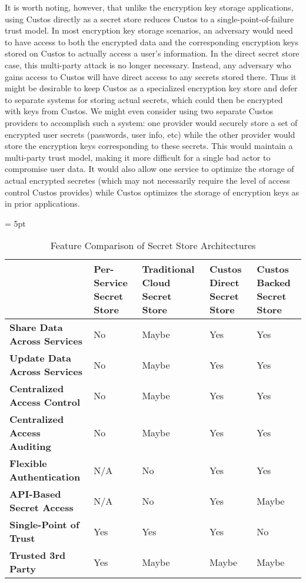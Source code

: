 It is worth noting, however, that unlike the encryption key storage
applications, using Custos directly as a secret store reduces Custos
to a single-point-of-failure trust model. In most encryption key
storage scenarios, an adversary would need to have access to both the
encrypted data and the corresponding encryption keys stored on Custos
to actually access a user's information. In the direct secret store
case, this multi-party attack is no longer necessary. Instead, any
adversary who gains access to Custos will have direct access to any
secrets stored there. Thus it might be desirable to keep Custos as a
specialized encryption key store and defer to separate systems for
storing actual secrets, which could then be encrypted with keys from
Custos. We might even consider using two separate Custos providers to
accomplish such a system: one provider would securely store a set of
encrypted user secrets (passwords, user info, etc) while the other
provider would store the encryption keys corresponding to these
secrets. This would maintain a multi-party trust model, making it more
difficult for a single bad actor to compromise user data. It would
also allow one service to optimize the storage of actual encrypted
secretes (which may not necessarily require the level of access
control Custos provides) while Custos optimizes the storage of
encryption keys as in prior applications.

\begin{table}[!tb]
  \vspace{5ex}
  \begin{center}
    \tabulinesep = 5pt
    \begin{tabu} to \textwidth
      { | X[1.5,c,m]
        | X[1,c,m]
        | X[1,c,m]
        | X[1,c,m]
        | X[1,c,m]
        | }
      \hline
      & \textbf{Per-Service Secret Store}
      & \textbf{Traditional Cloud Secret Store}
      & \textbf{Custos Direct Secret Store}
      & \textbf{Custos Backed Secret Store}
      \\ \hline
      \textbf{Share Data Across Services}
      & No & Maybe & Yes & Yes
      \\ \hline
      \textbf{Update Data Across Services}
      & No & Maybe & Yes & Yes
      \\ \hline
      \textbf{Centralized Access Control}
      & No & Maybe & Yes & Yes
      \\ \hline
      \textbf{Centralized Access Auditing}
      & No & Maybe & Yes & Yes
      \\ \hline
      \textbf{Flexible Authentication}
      & N/A & No & Yes & Yes
      \\ \hline
      \textbf{API-Based Secret Access}
      & N/A & No & Yes & Maybe
      \\ \hline
      \textbf{Single-Point of Trust}
      & Yes & Yes & Yes & No
      \\ \hline
      \textbf{Trusted 3rd Party}
      & Yes & Maybe & Maybe & Maybe
      \\ \hline
      \end{tabu}
  \end{center}
  \caption{Feature Comparison of Secret Store Architectures}
  \label{tab:comp-ss}
\end{table}

